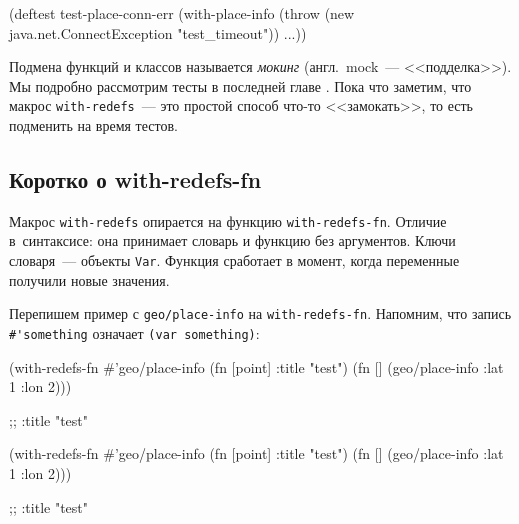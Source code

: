 \else

\begin{english}
  \begin{clojure}
(deftest test-place-conn-err
  (with-place-info
    (throw (new java.net.ConnectException "test_timeout"))
    ...))
  \end{clojure}
\end{english}

\fi


Подмена функций и классов называется \emph{мокинг} (англ.~mock~--- <<подделка>>). Мы
подробно рассмотрим тесты в последней главе . Пока что
заметим, что макрос \verb|with-redefs|~--- это простой способ что-то <<замокать>>,
то есть подменить на время тестов.

\subsection{Коротко о with-redefs-fn}


Макрос \verb|with-redefs| опирается на функцию \verb|with-redefs-fn|. Отличие
в~синтаксисе: она принимает словарь и функцию без аргументов. Ключи словаря~---
объекты \verb|Var|. Функция сработает в момент, когда переменные получили новые
значения.

Перепишем пример с \verb|geo/place-info| на \verb|with-redefs-fn|. Напомним, что
запись \verb|#'|\texttt{some\-thing} означает \verb|(var something)|:

\ifnarrow

\begin{english}
  \begin{clojure}
(with-redefs-fn
  {#'geo/place-info (fn [point]
                      {:title "test"})}
  (fn []
    (geo/place-info {:lat 1 :lon 2})))

;; {:title "test"}
  \end{clojure}
\end{english}

\else

\begin{english}
  \begin{clojure}
(with-redefs-fn
  {#'geo/place-info (fn [point] {:title "test"})}
  (fn []
    (geo/place-info {:lat 1 :lon 2})))

;; {:title "test"}
  \end{clojure}
\end{english}

